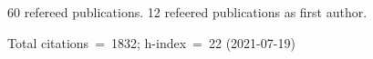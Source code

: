60 refereed publications. 12 refeered publications as first author.

Total citations~=~1832; h-index~=~22 (2021-07-19)